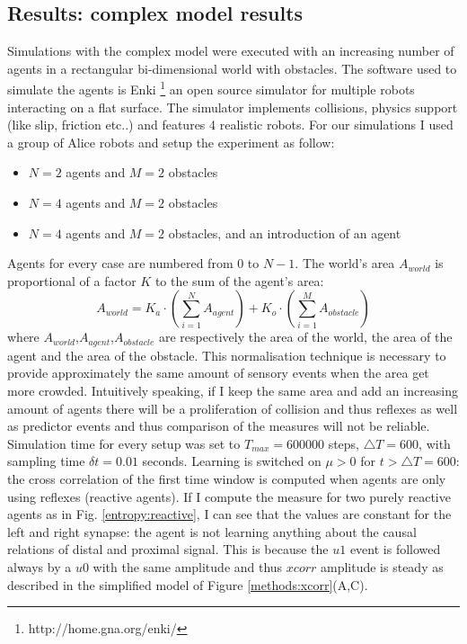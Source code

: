 \subsection{Results: complex model results}
Simulations with the complex model were executed with an increasing number of agents in a rectangular
bi-dimensional world with obstacles. 
The software used to simulate the agents is Enki \footnote{http://home.gna.org/enki/}
an open source simulator for multiple robots interacting on a flat surface.
The simulator implements collisions, physics support (like slip, friction etc..)
and features 4 realistic robots.
For our simulations I used a group of Alice robots and setup the experiment as follow:
\begin{itemize}
\item $N=2$ agents and  $M=2$ obstacles
\item $N=4$ agents and $M=2$ obstacles
\item $N=4$ agents and $M=2$ obstacles, and an introduction of an agent
\end{itemize}
Agents for every case are numbered from $0$ to $N-1$.
The world's area $A_{world}$ is proportional of a factor $K$ to the sum of the agent's area:
\begin{equation}
 A_{world}=K_{a} \cdot (\sum_{i=1}^{N} A_{agent} )+ K_{o} \cdot (\sum_{i=1}^{M} A_{obstacle} )
\end{equation}
where  $A_{world}$,$A_{agent}$,$A_{obstacle}$ are respectively the area of the world,
the area of the agent and the area of the obstacle.
This normalisation technique is necessary to provide approximately the same amount 
of sensory events when the area get more crowded.
Intuitively speaking, if I keep the same area and add an increasing amount of agents
there will be a proliferation of collision and thus reflexes as well as predictor
events and thus comparison of the measures will not be reliable.
Simulation time for every setup was set to $T_{max}=600000$ steps,
$\triangle T=600 $, with sampling time $\delta t=0.01$ seconds.
Learning is switched on $\mu >0$ for $t> \triangle T=600$:
the cross correlation of the first time window is
computed when agents are only using reflexes (reactive agents).
If I compute the measure for two purely reactive agents as in Fig. \ref{entropy:reactive},
I can see that the values are constant for the left and right synapse: the agent is not learning
anything about the causal relations of distal and proximal signal.
This is because the $u1$ event is followed always by a $u0$
with the same amplitude and thus $xcorr$ amplitude is steady as described in the 
simplified model of Figure \ref{methods:xcorr}(A,C).

